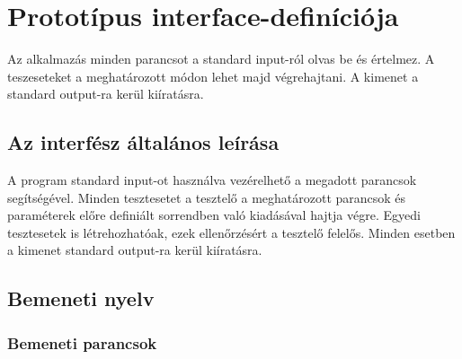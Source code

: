 \documentclass[../../projlab]{subfiles}
\begin{document}
\section{Prototípus interface-definíciója}
Az alkalmazás minden parancsot a standard input-ról olvas be és értelmez. A teszeseteket a meghatározott módon lehet majd végrehajtani.
A kimenet a standard output-ra kerül kiíratásra.
\subsection{Az interfész általános leírása}
A program standard input-ot használva vezérelhető a megadott parancsok segítségével. Minden tesztesetet a tesztelő a meghatározott parancsok és paraméterek előre definiált sorrendben való kiadásával hajtja végre. Egyedi tesztesetek is létrehozhatóak, ezek ellenőrzésért a tesztelő felelős.
Minden esetben a kimenet standard output-ra kerül kiíratásra.
\subsection{Bemeneti nyelv}

\subsubsection{Bemeneti parancsok}
\end{document}
